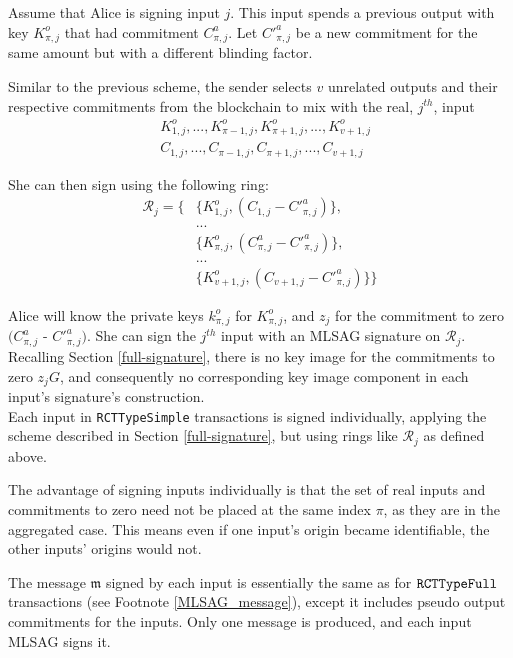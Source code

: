Assume that Alice is signing input $j$. This input spends a previous output with key $K^o_{\pi,j}$ that had commitment $C^a_{\pi,j}$. Let $C'^a_{\pi,j}$ be a new commitment for the same amount but with a different blinding factor.

Similar to the previous scheme, the sender selects $v$ unrelated outputs and their respective commitments from the blockchain to mix with the real, $j^{th}$, input
\begin{align*}
& K^o_{1, j}, ..., K^o_{\pi-1, j}, K^o_{\pi+1, j}, ..., K^o_{v+1, j} \\
& C_{1, j}, ..., C_{\pi-1, j}, C_{\pi+1, j}, ..., C_{v+1, j}
\end{align*}


She can then sign using the following ring:
\begin{align*}
\mathcal{R}_j = \{ &\{K^o_{1, j}, (C_{1, j} - C'^a_{\pi, j})\}, \\
&... \\
&\{ K^o_{\pi, j}, (C^a_{\pi, j} - C'^a_{\pi, j})\}, \\
&... \\
&\{ K^o_{v+1, j}, (C_{v+1, j} - C'^a_{\pi, j})\}\}
\end{align*}


Alice will know the private keys $k^o_{\pi,j}$ for $K^o_{\pi,j}$, and $z_j$ for the commitment to zero $(C^a_{\pi,j}$ - $C'^a_{\pi,j})$. She can sign the $j^{th}$ input with an MLSAG signature on $\mathcal{R}_j$. Recalling Section \ref{full-signature}, there is no key image for the commitments to zero $z_j G$, and consequently no corresponding key image component in each input’s signature’s construction.
\\

Each input in {\tt RCTTypeSimple} transactions is signed individually, applying the scheme described in Section \ref{full-signature}, but using rings like \(\mathcal{R}_j\) as defined above.

The advantage of signing inputs individually is that the set of real inputs and commitments to zero need not be placed at the same index $\pi$, as they are in the aggregated case. This means even if one input's origin became identifiable, the other inputs' origins would not.

The message $\mathfrak{m}$ signed by each input is essentially the same as for $\tt RCTTypeFull$ transactions (see Footnote \ref{MLSAG_message}), except it includes pseudo output commitments for the inputs. Only one message is produced, and each input MLSAG signs it.



